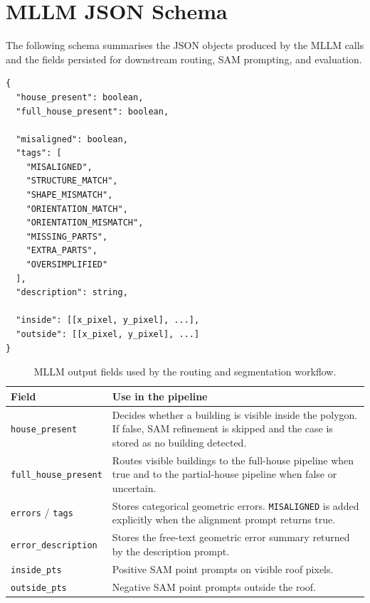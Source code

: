 \newpage

\section{MLLM JSON Schema}\thispagestyle{rmplain}
\label{app:mllm_json_schema}
\setcounter{figure}{0}
\setcounter{table}{0}

The following schema summarises the JSON objects produced by the MLLM calls and
the fields persisted for downstream routing, SAM prompting, and evaluation.

\begin{lstlisting}[basicstyle=\ttfamily\small,breaklines=true]
{
  "house_present": boolean,
  "full_house_present": boolean,

  "misaligned": boolean,
  "tags": [
    "MISALIGNED",
    "STRUCTURE_MATCH",
    "SHAPE_MISMATCH",
    "ORIENTATION_MATCH",
    "ORIENTATION_MISMATCH",
    "MISSING_PARTS",
    "EXTRA_PARTS",
    "OVERSIMPLIFIED"
  ],
  "description": string,

  "inside": [[x_pixel, y_pixel], ...],
  "outside": [[x_pixel, y_pixel], ...]
}
\end{lstlisting}

\begin{table}[htb]
\centering
\small
\begin{tabular}{|p{}|p{}|}
\hline
\textbf{Field} & \textbf{Use in the pipeline} \\
\hline
\texttt{house\_present} & Decides whether a building is visible inside the polygon. If false, SAM refinement is skipped and the case is stored as no building detected. \\
\hline
\texttt{full\_house\_present} & Routes visible buildings to the full-house pipeline when true and to the partial-house pipeline when false or uncertain. \\
\hline
\texttt{errors} / \texttt{tags} & Stores categorical geometric errors. \texttt{MISALIGNED} is added explicitly when the alignment prompt returns true. \\
\hline
\texttt{error\_description} & Stores the free-text geometric error summary returned by the description prompt. \\
\hline
\texttt{inside\_pts} & Positive SAM point prompts on visible roof pixels. \\
\hline
\texttt{outside\_pts} & Negative SAM point prompts outside the roof. \\
\hline
\end{tabular}
\caption{MLLM output fields used by the routing and segmentation workflow.}
\label{tab:mllm_schema}
\end{table}

